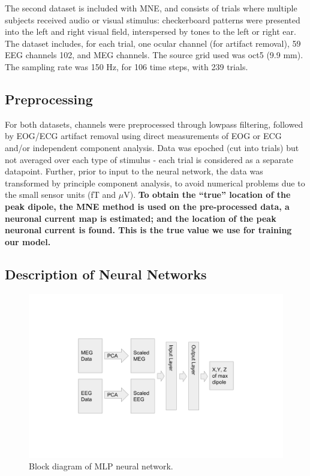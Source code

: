 \documentclass[journal]{IEEEtran}
\begin{document}
The second dataset \cite{gramfort2013meg} is included with MNE, and consists of trials where multiple subjects received audio or visual stimulus: checkerboard patterns were presented into the left and right visual field, interspersed by tones to the left or right ear. The dataset includes, for each trial, one ocular channel (for artifact removal), 59 EEG channels 102, and MEG channels. The source grid used was oct5 (9.9 mm). The sampling rate was 150 Hz, for 106 time steps, with 239 trials. 

\subsection{Preprocessing}
For both datasets, channels were preprocessed through lowpass filtering, followed by EOG/ECG artifact removal using direct measurements of EOG or ECG and/or independent component analysis. Data was epoched (cut into trials) but not averaged over each type of stimulus - each trial is considered as a separate datapoint. Further, prior to input to the neural network, the data was transformed by principle component analysis, to avoid numerical problems due to the small sensor units (fT and $\mu$V). \textbf{To obtain the ``true'' location of the peak dipole, the MNE method is used on the pre-processed data, a neuronal current map is estimated; and the location of the peak neuronal current is found. This is the true value we use for training our model.}

\subsection{Description of Neural Networks} 
\begin{figure}[h!]
\centering
\includegraphics[width=5in]{mlp}
\caption{Block diagram of MLP neural network.}
\label{fig:mlp}
\end{figure}
\end{document}
